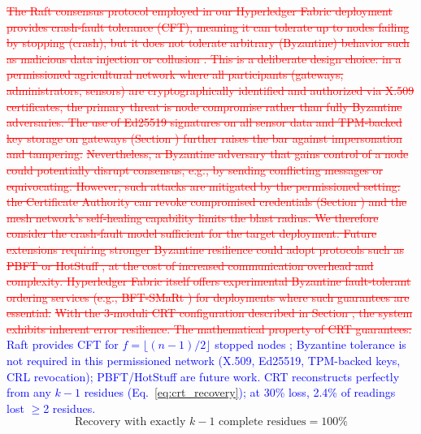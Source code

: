 \documentclass[pdflatex,sn-mathphys-num]{sn-jnl}
\theoremstyle{thmstyleone}
\theoremstyle{thmstyletwo}
\theoremstyle{thmstylethree}
\begin{document}
{\textcolor{red}{\sout{The Raft consensus protocol employed in our Hyperledger Fabric deployment provides crash‑fault tolerance (CFT), meaning it can tolerate up to nodes failing by stopping (crash), but it does not tolerate arbitrary (Byzantine) behavior such as malicious data injection or collusion . This is a deliberate design choice: in a permissioned agricultural network where all participants (gateways, administrators, sensors) are cryptographically identified and authorized via X.509 certificates, the primary threat is node compromise rather than fully Byzantine adversaries. The use of Ed25519 signatures on all sensor data and TPM‑backed key storage on gateways (Section ) further raises the bar against impersonation and tampering.}}
\textcolor{red}{\sout{Nevertheless, a Byzantine adversary that gains control of a node could potentially disrupt consensus, e.g., by sending conflicting messages or equivocating. However, such attacks are mitigated by the permissioned setting: the Certificate Authority can revoke compromised credentials (Section ) and the mesh network's self‑healing capability limits the blast radius. We therefore consider the crash‑fault model sufficient for the target deployment. Future extensions requiring stronger Byzantine resilience could adopt protocols such as PBFT or HotStuff , at the cost of increased communication overhead and complexity. Hyperledger Fabric itself offers experimental Byzantine fault‑tolerant ordering services (e.g., BFT‑SMaRt ) for deployments where such guarantees are essential.}}
\textcolor{red}{\sout{With the 3‑moduli CRT configuration described in Section , the system exhibits inherent error resilience. The mathematical property of CRT guarantees:}}
\textcolor{blue}{Raft provides CFT for $f = \lfloor (n-1)/2 \rfloor$ stopped nodes \cite{ongaro2014raft}; Byzantine tolerance is not required in this permissioned network (X.509, Ed25519, TPM-backed keys, CRL revocation); PBFT/HotStuff \cite{castro1999practical,yin2019hotstuff} are future work. CRT reconstructs perfectly from any $k-1$ residues (Eq.~\ref{eq:crt_recovery}); at 30\% loss, 2.4\% of readings lost $\geq$2 residues.}
\begin{equation}
\text{Recovery with exactly } k-1 \text{ complete residues} = 100\%
\label{eq:crt_recovery}
\end{equation}

}
\end{document}
